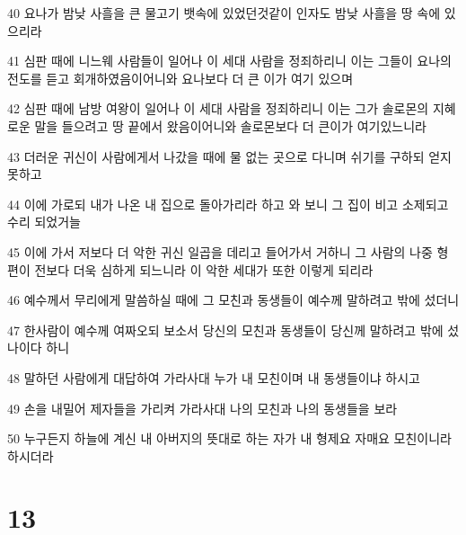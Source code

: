 \par 40 요나가 밤낮 사흘을 큰 물고기 뱃속에 있었던것같이 인자도 밤낮 사흘을 땅 속에 있으리라
\par 41 심판 때에 니느웨 사람들이 일어나 이 세대 사람을 정죄하리니 이는 그들이 요나의 전도를 듣고 회개하였음이어니와 요나보다 더 큰 이가 여기 있으며
\par 42 심판 때에 남방 여왕이 일어나 이 세대 사람을 정죄하리니 이는 그가 솔로몬의 지혜로운 말을 들으려고 땅 끝에서 왔음이어니와 솔로몬보다 더 큰이가 여기있느니라
\par 43 더러운 귀신이 사람에게서 나갔을 때에 물 없는 곳으로 다니며 쉬기를 구하되 얻지 못하고
\par 44 이에 가로되 내가 나온 내 집으로 돌아가리라 하고 와 보니 그 집이 비고 소제되고 수리 되었거늘
\par 45 이에 가서 저보다 더 악한 귀신 일곱을 데리고 들어가서 거하니 그 사람의 나중 형편이 전보다 더욱 심하게 되느니라 이 악한 세대가 또한 이렇게 되리라
\par 46 예수께서 무리에게 말씀하실 때에 그 모친과 동생들이 예수께 말하려고 밖에 섰더니
\par 47 한사람이 예수께 여짜오되 보소서 당신의 모친과 동생들이 당신께 말하려고 밖에 섰나이다 하니
\par 48 말하던 사람에게 대답하여 가라사대 누가 내 모친이며 내 동생들이냐 하시고
\par 49 손을 내밀어 제자들을 가리켜 가라사대 나의 모친과 나의 동생들을 보라
\par 50 누구든지 하늘에 계신 내 아버지의 뜻대로 하는 자가 내 형제요 자매요 모친이니라 하시더라

\chapter{13}

